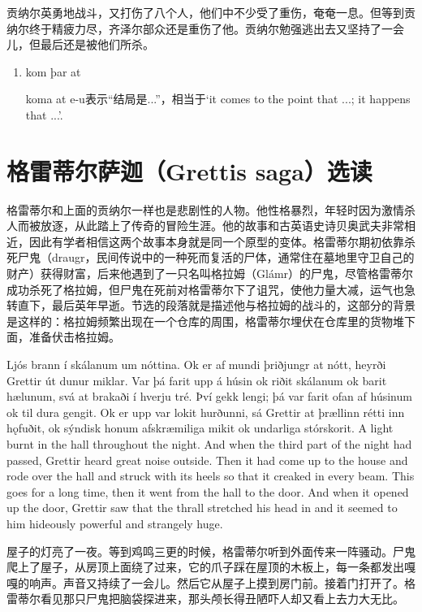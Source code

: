\begin{translation*}{}
  贡纳尔英勇地战斗，又打伤了八个人，他们中不少受了重伤，奄奄一息。但等到贡纳尔终于精疲力尽，齐泽尔部众还是重伤了他。贡纳尔勉强逃出去又坚持了一会儿，但最后还是被他们所杀。
\end{translation*}
\begin{grammar*}{}
  \begin{enumerate}[leftmargin=*]
    \item kom þar at

          koma at e-u表示“结局是...”，相当于`it comes to the point that ...; it happens that ...'.
  \end{enumerate}
\end{grammar*}
\section{格雷蒂尔萨迦（Grettis saga）选读}
格雷蒂尔和上面的贡纳尔一样也是悲剧性的人物。他性格暴烈，年轻时因为激情杀人而被放逐，从此踏上了传奇的冒险生涯。他的故事和古英语史诗贝奥武夫非常相近，因此有学者相信这两个故事本身就是同一个原型的变体。格雷蒂尔期初依靠杀死尸鬼（draugr，民间传说中的一种死而复活的尸体，通常住在墓地里守卫自己的财产）获得财富，后来他遇到了一只名叫格拉姆（Glámr）的尸鬼，尽管格雷蒂尔成功杀死了格拉姆，但尸鬼在死前对格雷蒂尔下了诅咒，使他力量大减，运气也急转直下，最后英年早逝。节选的段落就是描述他与格拉姆的战斗的，这部分的背景是这样的：格拉姆频繁出现在一个仓库的周围，格雷蒂尔埋伏在仓库里的货物堆下面，准备伏击格拉姆。
\begin{paracol}{2}
  Ljós brann í skálanum um nóttina. Ok er af mundi þrið\-jungr at nótt, heyrði Grettir út dunur miklar. Var þá farit upp á húsin ok riðit skálanum ok barit hælunum, svá at brakaði í hverju tré. Því gekk lengi; þá var farit ofan af húsinum ok til dura gengit. Ok er upp var lokit hurðunni, sá Grettir at þrællinn rétti inn hǫfuðit, ok sýndisk honum afskræmiliga mikit ok undarliga stórskorit.
  \switchcolumn
  A light burnt in the hall throughout the night. And when the third part of the night had passed, Grettir heard great noise outside. Then it had come up to the house and rode over the hall and struck with its heels so that it creaked in every beam. This goes for a long time, then it went from the hall to the door. And when it opened up the door, Grettir saw that the thrall stretched his head in and it seemed to him hideously powerful and strangely huge.
\end{paracol}
\begin{translation*}{}
  屋子的灯亮了一夜。等到鸡鸣三更的时候，格雷蒂尔听到外面传来一阵骚动。尸鬼爬上了屋子，从房顶上面绕了过来，它的爪子踩在屋顶的木板上，每一条都发出嘎嘎的响声。声音又持续了一会儿。然后它从屋子上摸到房门前。接着门打开了。格雷蒂尔看见那只尸鬼把脑袋探进来，那头颅长得丑陋吓人却又看上去力大无比。
\end{translation*}
